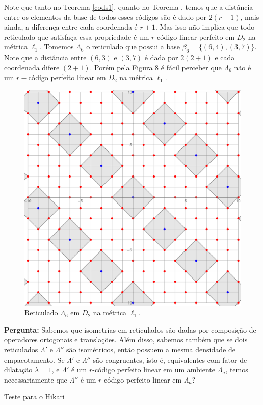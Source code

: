 \documentclass{article}
\theoremstyle{plain}
\theoremstyle{definition}
\theoremstyle{remark}
\begin{document}
  Note que tanto no Teorema \ref{cods1}, quanto no Teorema , temos que a distância entre os elementos da base de todos esses códigos são é dado por $2(r+1)$, mais ainda, a diferença entre cada coordenada é $r+1$. Mas isso não implica que todo reticulado que satisfaça essa propriedade é um $r$-código linear perfeito em $D_2$ na métrica $\ell_1$. Tomemos $\Lambda_6$ o reticulado que possui a base $\beta_6 = \{(6,4),(3,7)\}$. Note que a distância entre $(6,3)$ e $(3,7)$ é dada por $2(2+1)$ e cada coordenada difere $(2+1)$. Porém pela Figura 8 é fácil perceber que $\Lambda_6$ não é um $r-$código perfeito linear em $D_2$ na métrica $\ell_1$. 

  \begin{figure}[ht]
    \centering
        \includegraphics[scale=0.23]{notperfect.pdf}
        \caption{Reticulado $\Lambda_6$ em $D_2$ na métrica $\ell_1$.}
  \end{figure}

  \hspace{-0.5cm}\textbf{Pergunta:} Sabemos que isometrias em reticulados são dadas por composição de operadores ortogonais e translações. Além disso, sabemos também que se dois reticulados $\Lambda'$ e $\Lambda''$ são isométricos, então possuem a mesma densidade de empacotamento. Se $\Lambda'$ e $\Lambda''$ são congruentes, isto é, equivalentes com fator de dilatação $\lambda=1$, e $\Lambda'$ é um $r$-código perfeito linear em um ambiente $\Lambda_a$, temos necessariamente que $\Lambda''$ é um $r$-código perfeito linear em $\Lambda_a$?

  Teste para o Hikari

  
\end{document}
